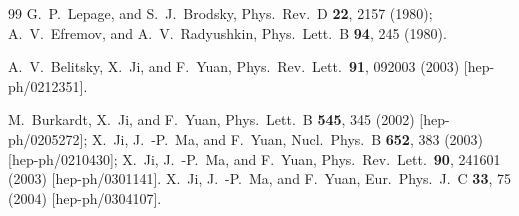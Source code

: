 \documentclass[aps,prd,preprint,tightenlines,superscriptaddress]{revtex4}
\begin{document}
\begin{thebibliography}{99}
  G.~P.~Lepage, and S.~J.~Brodsky,
  Phys.\ Rev.\ D {\bf 22}, 2157 (1980);
  A.~V.~Efremov, and A.~V.~Radyushkin,
  Phys.\ Lett.\ B {\bf 94}, 245 (1980).

  A.~V.~Belitsky, X.~Ji, and F.~Yuan,
  Phys.\ Rev.\ Lett.\  {\bf 91}, 092003 (2003)
  [hep-ph/0212351].

  M.~Burkardt, X.~Ji, and F.~Yuan,
  Phys.\ Lett.\ B {\bf 545}, 345 (2002)
  [hep-ph/0205272];
  X.~Ji, J.~-P.~Ma, and F.~Yuan,
  Nucl.\ Phys.\ B {\bf 652}, 383 (2003)
  [hep-ph/0210430]; %
  X.~Ji, J.~-P.~Ma, and F.~Yuan,
  Phys.\ Rev.\ Lett.\  {\bf 90}, 241601 (2003)
  [hep-ph/0301141].
  X.~Ji, J.~-P.~Ma, and F.~Yuan,
  Eur.\ Phys.\ J.\ C {\bf 33}, 75 (2004)
  [hep-ph/0304107].


\end{thebibliography}
\end{document}
